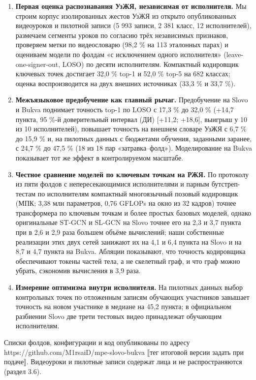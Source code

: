 \begin{enumerate}
\def\labelenumi{\arabic{enumi}.}
\tightlist
\item
  \textbf{Первая оценка распознавания УзЖЯ, независимая от исполнителя.} Мы строим корпус изолированных жестов УзЖЯ из открыто опубликованных видеоуроков и пилотной записи (5 993 записи, 2 381 класс, 12 исполнителей), размечаем сегменты уроков по согласию трёх независимых признаков, проверяем метки по видеословарю (98,2 \% на 113 эталонных парах) и оцениваем модели по фолдам «с исключением одного исполнителя» (leave-one-signer-out, LOSO) по десяти исполнителям. Компактный кодировщик ключевых точек достигает 32,0 \% top-1 и 52,0 \% top-5 на 682 классах; оценка воспроизводится на двух внешних источниках (33,3 \% и 33,7 \%).
\item
  \textbf{Межъязыковое предобучение как главный рычаг.} Предобучение на Slovo и Bukva поднимает точность top-1 по LOSO с 17,3 \% до 32,0 \% (+14,7 пункта, 95 \%-й доверительный интервал (ДИ) {[}+11,2; +18,6{]}, выигрыш у 10 из 10 исполнителей), повышает точность на внешнем словаре УзЖЯ с 6,7 \% до 15,9 \% и, на пилотных данных с бюджетами обучения, заданными заранее, с 24,7 \% до 47,5 \% (18 из 18 пар «затравка--фолд»). Моделирование на Bukva показывает тот же эффект в контролируемом масштабе.
\item
  \textbf{Честное сравнение моделей по ключевым точкам на РЖЯ.} По протоколу из пяти фолдов с непересекающимися исполнителями и парным бутстреп-тестам по исполнителям компактный многоязычный позовый кодировщик (МПК; 3,38 млн параметров, 0,76 GFLOPs на окно из 32 кадров) точнее трансформера по ключевым точкам и более простых базовых моделей, однако оригинальные ST-GCN \citep{2018_yan_stgcn} и SL-GCN \citep{2021_jiang_sam_slr} на Slovo точнее его на 2,3 и 3,7 пункта при в 2,6 и 2,9 раза большем объёме вычислений; наши собственные реализации этих двух сетей занижают их на 4,1 и 6,4 пункта на Slovo и на 8,7 и 4,7 пункта на Bukva. Абляции показывают, что точность кодировщика обеспечивают токены частей тела, а не скелетный граф, и что граф можно убрать, сэкономив вычисления в 3,9 раза.
\item
  \textbf{Измерение оптимизма внутри исполнителя.} На пилотных данных выбор контрольных точек по отложенным записям обучающих участников завышает точность на новом участнике в медиане на 45,2 пункта; в официальном разбиении Slovo две трети тестовых видео принадлежат обучающим исполнителям.
\end{enumerate}

Списки фолдов, конфигурации и код опубликованы по адресу https://github.com/M1rsaiD/mpe-slovo-bukva ⟦тег итоговой версии задать при подаче⟧. Видеоуроки и пилотные записи содержат лица и не распространяются (раздел 3.6).

